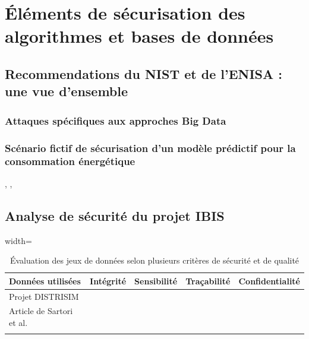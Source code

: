 \chapter{Éléments de sécurisation des algorithmes et bases de données}\label{ch:elements-de-securisation-des-algorithmes-et-bases-de-donnees}

\section{Recommendations du NIST et de l'ENISA : une vue d'ensemble}\label{sec:pratiques-securitaires-de-developpement-pour-python-et-le-calcul-scientifique}

    \subsection{Attaques spécifiques aux approches Big Data}\label{subsec:attaques-specifiques-aux-approches-big-data}

    \subsection{Scénario fictif de sécurisation d'un modèle prédictif pour la consommation énergétique}\label{subsec:scenario-fictif-de-securisation-d'un-modele-predictif-pour-la-consommation-energetique}

\cite{ENISA_securing_ML,ENISA_AI_standardization},
\cite{ENISA_AI_forecasting_demand_electricity},
\cite{ENISA_AI_cyber_research}

\section{Analyse de sécurité du projet IBIS}\label{sec:analyse-de-risques-inherents-au-machine-learning}

    \begin{table}[h!]
            \centering
            \caption{Évaluation des jeux de données selon plusieurs critères de sécurité et de qualité}\label{tab:table4}
            \begin{adjustbox}{width=\textwidth}
            \begin{tabular}{lcccc}
                \toprule
                \textbf{Données utilisées} & \textbf{Intégrité} & \textbf{Sensibilité} & \textbf{Traçabilité} & \textbf{Confidentialité} \\
                \midrule
                Projet DISTRISIM &  &  &  &  \\
                Article de Sartori et al. &  &  &  &  \\
                &  &  &  &  \\
                \bottomrule
            \end{tabular}
            \label{tab:datasets}
            \end{adjustbox}
    \end{table}

